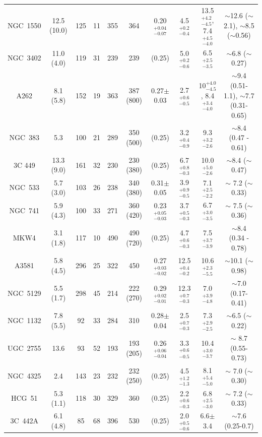 \documentclass{aastex}
\begin{document}
\begin{table}
\begin{center}
{\begin{tabular}{cccccccccc}
NGC~1550 & 12.5 (10.0) & 125 & 11 & 355 & 364 & 0.20$^{+0.04}_{-0.07}$ & 4.5$^{+0.2}_{-0.4}$ & 13.5$^{+4.2}_{-4.5}$, 7.4$^{+4.5}_{-4.0}$ & $\sim$12.6 ($\sim$2.1), $\sim$8.5 ($\sim$0.56) \\
NGC~3402 & 11.0 (4.0) & 119 & 31 & 239 & 239 & (0.25) & 5.0$^{+0.2}_{-0.6}$ & 6.5$^{+2.5}_{-3.5}$ & $\sim$6.8 ($\sim$ 0.27) \\
A262     & 8.1 (5.8) & 152 & 19 & 363 & 387 (800) & 0.27$\pm$0.03 & 2.7$^{+0.6}_{-0.5}$ & 10$^{+4.0}_{-4.5}$, 8.4$^{+3.4}_{-4.0}$ & $\sim$9.4 (0.51-1.1), $\sim$7.7 (0.31-0.65) \\
NGC~383  & 5.3 & 100 & 21 & 289 & 350 (500) & (0.25) & 3.2$^{+0.4}_{-0.9}$ & 9.3$^{+3.2}_{-2.6}$ & $\sim$8.4 (0.47 - 0.61) \\
3C 449   & 13.3 (9.0) & 161 & 32 & 230 & 230 (380) & (0.25) & 6.7$^{+0.8}_{-0.3}$ & 10.0$^{+5.0}_{-2.6}$ & $\sim$8.4 ($\sim$0.47) \\
NGC~533  & 5.7 (3.0) & 103 & 26 & 238 & 340 (380) & 0.31$\pm$0.05 & 3.9$^{+0.9}_{-0.5}$ & 7.1$^{+2.5}_{-2.2}$ & $\sim$ 7.2 ($\sim$ 0.33) \\
NGC~741  & 5.9 (4.3) & 100 & 33 & 271 & 360 (420) & 0.23$^{+0.05}_{-0.03}$ & 3.7$^{+0.5}_{-0.3}$ & 6.7$^{+3.0}_{-3.5}$ & $\sim$ 7.5 ($\sim$ 0.36) \\
MKW4     & 3.1 (1.8) & 117 & 10 & 490 & 490 (720) & (0.25) & 4.7$^{+0.6}_{-0.3}$ & 7.5$^{+3.7}_{-3.9}$ & $\sim$8.4  (0.34 - 0.78) \\
A3581    & 5.8 (4.5) & 296 & 25 & 322 & 450 & 0.27$^{+0.03}_{-0.02}$ & 12.5$^{+0.4}_{-0.2}$ & 10.6$^{+2.3}_{-5.5}$ & $\sim$10.1 ($\sim$0.98)\\
NGC~5129 & 5.5 (1.7) & 298 & 45 & 214 & 222 (270) & 0.29$^{+0.02}_{-0.01}$ & 12.3$^{+0.7}_{-0.3}$ & 7.0$^{+3.9}_{-4.8}$ & $\sim$7.0 (0.17-0.41) \\
NGC~1132 & 7.8 (5.5) & 92 & 33 & 284 & 310 & 0.28$\pm$0.04 & 2.5$^{+0.7}_{-0.3}$ & 7.3$^{+2.9}_{-2.5}$ & $\sim$6.5 ($\sim$0.22) \\
UGC~2755 & 13.6 & 93 & 52 & 193 & 193 (205) & 0.26$^{+0.06}_{-0.04}$ & 3.3$^{+0.6}_{-0.5}$ & 10.4$^{+3.0}_{-3.7}$ & $\sim$ 8.7 (0.55-0.73) \\
NGC~4325 & 2.4 & 143 & 23 & 232 & 232 (250) & (0.25) & 4.5$^{+1.2}_{-1.3}$ & 8.1$^{+5.4}_{-5.0}$ & $\sim$ 7.0 ($\sim$ 0.30) \\
HCG~51   & 5.3 (1.1) & 118 & 30 & 329 & 360 & (0.25) & 2.2$^{+0.6}_{-0.3}$ & 6.8$^{+2.5}_{-3.0}$ & $\sim$ 7.2 ($\sim$ 0.33) \\
3C~442A  & 6.1 (4.8) & 85 & 68 & 396 & 530 & (0.25) & 2.0$^{+0.5}_{-0.6}$ & 6.6$\pm$3.4 & $\sim$7.6 (0.25-0.7) \\

\end{tabular}}
\end{center}
\end{table}
\end{document}

